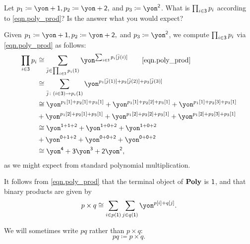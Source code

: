 \documentclass[Book-Poly]{subfiles}
\begin{document}
\begin{exercise}
  Let $p_1\coloneqq\yon+\1, p_2\coloneqq\yon+\2,$ and $p_3\coloneqq\yon^\2$.
  What is $\prod_{i\in\textsf{3}}p_i$ according to \eqref{eqn.poly_prod}? Is the answer what you would expect?
  \begin{solution}
    Given $p_1\coloneqq\yon+\1,p_2\coloneqq\yon+\2,$ and $p_3\coloneqq\yon^\2$, we compute $\prod_{i\in\textsf{3}}p_i$ via \eqref{eqn.poly_prod} as follows:
    \begin{align*}
      \prod_{i\in\3} p_i
      &\iso
      \sum_{\bar{j} \in \prod_{i\in\3} p_i(\1)} \yon^{\sum_{i\in\3} p_i[\bar{j}(i)]}
      \tag*{\eqref{eqn.poly_prod}} \\
      &\iso
      \sum_{\bar{j} \colon (i\in\3) \to p_i(\1)} \yon^{p_1[\bar{j}(1)] + p_2[\bar{j}(2)] + p_3[\bar{j}(3)]} \\
      &\iso
      \yon^{p_1[1] + p_2[1] + p_3[1]}
      + \yon^{p_1[1] + p_2[2] + p_3[1]}
      + \yon^{p_1[1] + p_2[3] + p_3[1]} \\
      &+ \yon^{p_1[2] + p_2[1] + p_3[1]}
      + \yon^{p_1[2] + p_2[2] + p_3[1]}
      + \yon^{p_1[2] + p_2[3] + p_3[1]} \\
      &\iso
      \yon^{\1 + \1 + \2}
      + \yon^{\1 + \0 + \2}
      + \yon^{\1 + \0 + \2} \\
      &+ \yon^{\0 + \1 + \2}
      + \yon^{\0 + \0 + \2}
      + \yon^{\0 + \0 + \2} \\
      &\iso
      \yon^\4 + \3\yon^\3 + \2\yon^\2,
    \end{align*}
    as we might expect from standard polynomial multiplication.
  \end{solution}
\end{exercise}

It follows from \eqref{eqn.poly_prod} that the terminal object of $\mathbf{Poly}$ is $\textsf{1}$, and that binary products are given by
\begin{equation}\label{eqn.poly_times}
  p \times q \iso \sum_{i \in p(\1)} \sum_{j \in q(\1)} \yon^{p[i] + q[j]}.
\end{equation}

We will sometimes write $pq$ rather than $p\times q$:
\[
  pq\coloneqq p\times q.
\]
\end{document}
